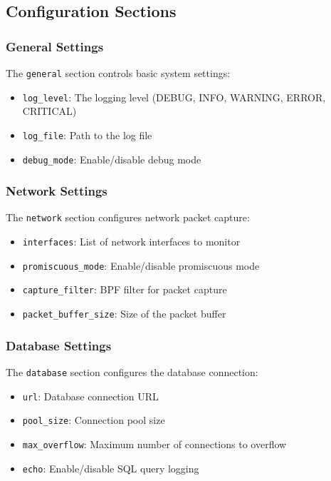\subsection{Configuration Sections}

\subsubsection{General Settings}
The \texttt{general} section controls basic system settings:

\begin{itemize}
    \item \texttt{log\_level}: The logging level (DEBUG, INFO, WARNING, ERROR, CRITICAL)
    \item \texttt{log\_file}: Path to the log file
    \item \texttt{debug\_mode}: Enable/disable debug mode
\end{itemize}

\subsubsection{Network Settings}
The \texttt{network} section configures network packet capture:

\begin{itemize}
    \item \texttt{interfaces}: List of network interfaces to monitor
    \item \texttt{promiscuous\_mode}: Enable/disable promiscuous mode
    \item \texttt{capture\_filter}: BPF filter for packet capture
    \item \texttt{packet\_buffer\_size}: Size of the packet buffer
\end{itemize}

\subsubsection{Database Settings}
The \texttt{database} section configures the database connection:

\begin{itemize}
    \item \texttt{url}: Database connection URL
    \item \texttt{pool\_size}: Connection pool size
    \item \texttt{max\_overflow}: Maximum number of connections to overflow
    \item \texttt{echo}: Enable/disable SQL query logging
\end{itemize}

